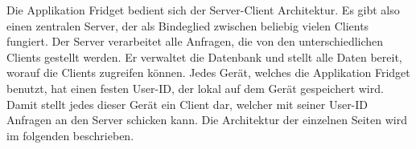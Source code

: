 Die Applikation Fridget bedient sich der Server-Client Architektur. Es gibt also einen zentralen Server, der als Bindeglied zwischen beliebig vielen Clients fungiert.
Der Server verarbeitet alle Anfragen, die von den unterschiedlichen Clients gestellt werden. Er verwaltet die Datenbank und stellt alle Daten bereit, worauf die Clients zugreifen können.
Jedes Gerät, welches die Applikation Fridget benutzt, hat einen festen User-ID, der lokal auf dem Gerät gespeichert wird. Damit stellt jedes dieser Gerät ein Client dar, welcher mit seiner User-ID Anfragen an den Server schicken kann. 
Die Architektur der einzelnen Seiten wird im folgenden beschrieben.  
